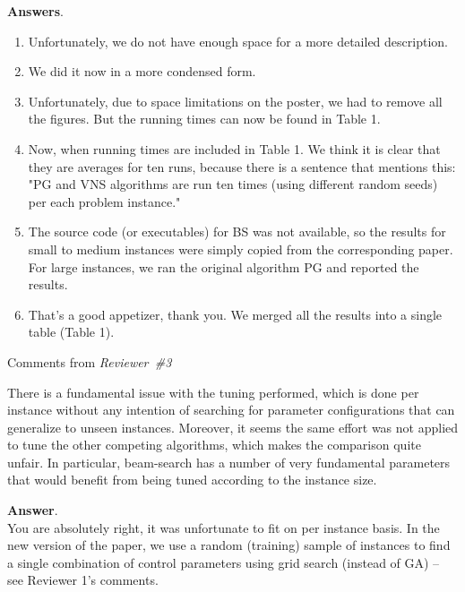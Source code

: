 \documentclass [11pt]{scrartcl}
\begin{document}
\textbf{Answers}. 
\begin{enumerate}
	
\item Unfortunately, we do not have enough space for a more detailed description.
\item We did it now in a more condensed form. 
\item Unfortunately, due to space limitations on the poster, we had to remove all the figures. But the running times can now be found in Table 1.
\item Now, when running times are included in Table 1. We think it is clear that they are averages for ten runs, because there is a sentence that mentions this:\\ 
"PG and VNS algorithms are run ten times (using different random seeds) per each problem instance."
\item The source code (or executables) for BS was not available, so the results for small to medium instances were simply copied from the corresponding paper. For large instances, we ran the original algorithm PG and reported the results.
\item That's a good appetizer, thank you. We merged all the results into a single table (Table 1).
 
\end{enumerate}

\begin{center} Comments from \textit{Reviewer\ \#3}
	
\end{center}


\begin{leftbar}
There is a fundamental issue with the tuning performed, which is done per instance without any intention of searching for parameter configurations that can generalize to unseen instances. Moreover, it seems the same effort was not applied to tune the other competing algorithms, which makes the comparison quite unfair. In particular, beam-search has a number of very fundamental parameters that would benefit from being tuned according to the instance size.	
\end{leftbar}

\textbf{Answer}. \\
You are absolutely right, it was unfortunate to fit on per instance basis.
In the new version of the paper, we use a random (training) sample of instances to find a single combination of control parameters using grid search (instead of GA) -- see Reviewer 1's comments.
\end{document}
